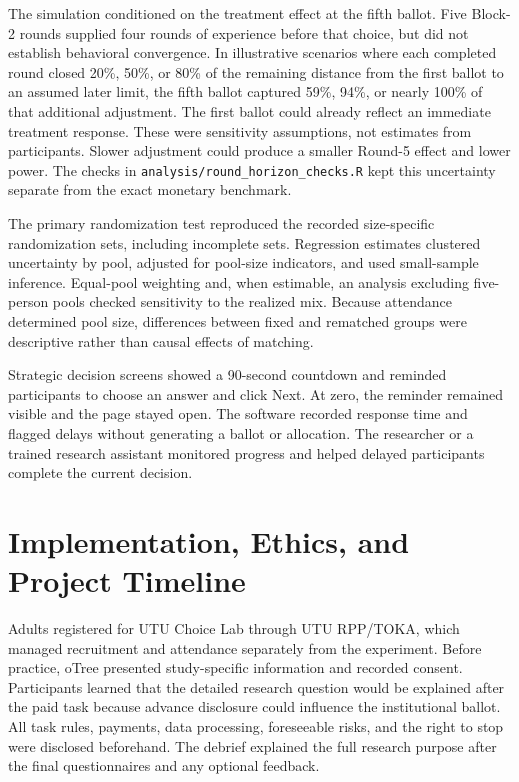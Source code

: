\documentclass[11pt]{article}
\begin{document}
The simulation conditioned on the treatment effect at the fifth ballot. Five Block-2 rounds supplied four rounds of experience before that choice, but did not establish behavioral convergence. In illustrative scenarios where each completed round closed 20\%, 50\%, or 80\% of the remaining distance from the first ballot to an assumed later limit, the fifth ballot captured 59\%, 94\%, or nearly 100\% of that additional adjustment. The first ballot could already reflect an immediate treatment response. These were sensitivity assumptions, not estimates from participants. Slower adjustment could produce a smaller Round-5 effect and lower power. The checks in \texttt{analysis/round\_horizon\_checks.R} kept this uncertainty separate from the exact monetary benchmark.

The primary randomization test reproduced the recorded size-specific randomization sets, including incomplete sets. Regression estimates clustered uncertainty by pool, adjusted for pool-size indicators, and used small-sample inference. Equal-pool weighting and, when estimable, an analysis excluding five-person pools checked sensitivity to the realized mix. Because attendance determined pool size, differences between fixed and rematched groups were descriptive rather than causal effects of matching.

Strategic decision screens showed a 90-second countdown and reminded participants to choose an answer and click Next. At zero, the reminder remained visible and the page stayed open. The software recorded response time and flagged delays without generating a ballot or allocation. The researcher or a trained research assistant monitored progress and helped delayed participants complete the current decision.

\section{Implementation, Ethics, and Project Timeline}

Adults registered for UTU Choice Lab through UTU RPP/TOKA, which managed recruitment and attendance separately from the experiment. Before practice, oTree presented study-specific information and recorded consent. Participants learned that the detailed research question would be explained after the paid task because advance disclosure could influence the institutional ballot. All task rules, payments, data processing, foreseeable risks, and the right to stop were disclosed beforehand. The debrief explained the full research purpose after the final questionnaires and any optional feedback.
\end{document}
